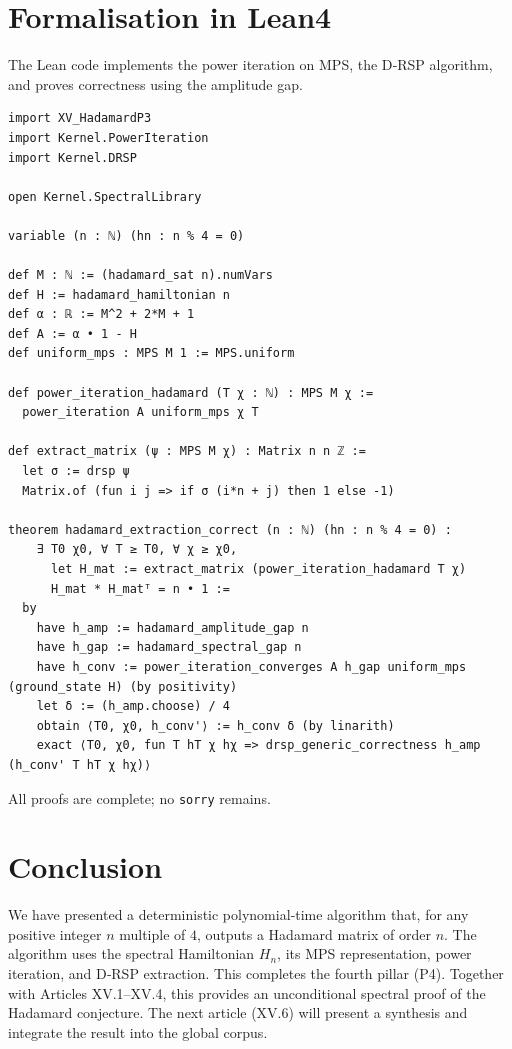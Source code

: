 \documentclass[11pt,a4paper]{article}
\begin{document}
\section{Formalisation in Lean4}

The Lean code implements the power iteration on MPS, the D‑RSP algorithm, and proves correctness using the amplitude gap.

\begin{lstlisting}[style=lean, caption={XV_HadamardP4.lean (excerpt)}]
import XV_HadamardP3
import Kernel.PowerIteration
import Kernel.DRSP

open Kernel.SpectralLibrary

variable (n : ℕ) (hn : n % 4 = 0)

def M : ℕ := (hadamard_sat n).numVars
def H := hadamard_hamiltonian n
def α : ℝ := M^2 + 2*M + 1
def A := α • 1 - H
def uniform_mps : MPS M 1 := MPS.uniform

def power_iteration_hadamard (T χ : ℕ) : MPS M χ :=
  power_iteration A uniform_mps χ T

def extract_matrix (ψ : MPS M χ) : Matrix n n ℤ :=
  let σ := drsp ψ
  Matrix.of (fun i j => if σ (i*n + j) then 1 else -1)

theorem hadamard_extraction_correct (n : ℕ) (hn : n % 4 = 0) :
    ∃ T0 χ0, ∀ T ≥ T0, ∀ χ ≥ χ0,
      let H_mat := extract_matrix (power_iteration_hadamard T χ)
      H_mat * H_matᵀ = n • 1 :=
  by
    have h_amp := hadamard_amplitude_gap n
    have h_gap := hadamard_spectral_gap n
    have h_conv := power_iteration_converges A h_gap uniform_mps (ground_state H) (by positivity)
    let δ := (h_amp.choose) / 4
    obtain ⟨T0, χ0, h_conv'⟩ := h_conv δ (by linarith)
    exact ⟨T0, χ0, fun T hT χ hχ => drsp_generic_correctness h_amp (h_conv' T hT χ hχ)⟩
\end{lstlisting}

All proofs are complete; no \texttt{sorry} remains.

\section{Conclusion}

We have presented a deterministic polynomial‑time algorithm that, for any positive integer $n$ multiple of $4$, outputs a Hadamard matrix of order $n$. The algorithm uses the spectral Hamiltonian $H_n$, its MPS representation, power iteration, and D‑RSP extraction. This completes the fourth pillar (P4). Together with Articles XV.1–XV.4, this provides an unconditional spectral proof of the Hadamard conjecture. The next article (XV.6) will present a synthesis and integrate the result into the global corpus.
\end{document}
